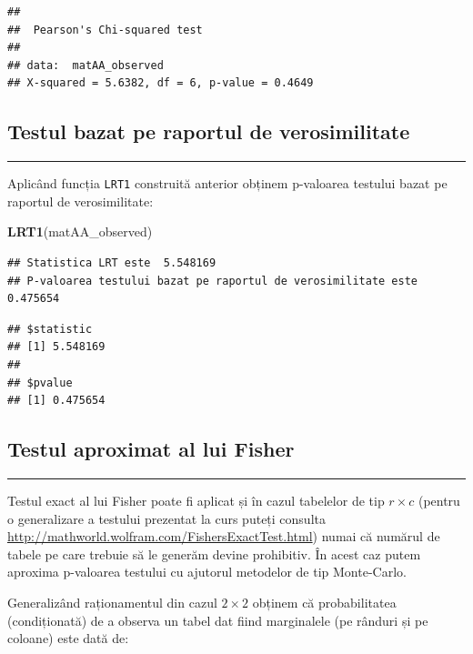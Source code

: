 \documentclass[]{article}
\newenvironment{Shaded}{\begin{snugshade}}{\end{snugshade}}
\newcommand{\KeywordTok}[1]{\textcolor[rgb]{0.13,0.29,0.53}{\textbf{{#1}}}}
\newcommand{\NormalTok}[1]{{#1}}
\begin{document}
\begin{verbatim}
## 
##  Pearson's Chi-squared test
## 
## data:  matAA_observed
## X-squared = 5.6382, df = 6, p-value = 0.4649
\end{verbatim}

\subsection{Testul bazat pe raportul de
verosimilitate}\label{testul-bazat-pe-raportul-de-verosimilitate}

\begin{center}\rule{0.5\linewidth}{\linethickness}\end{center}

Aplicând funcția \texttt{LRT1} construită anterior obținem p-valoarea
testului bazat pe raportul de verosimilitate:

\begin{Shaded}
\begin{Highlighting}[]
\KeywordTok{LRT1}\NormalTok{(matAA_observed)}
\end{Highlighting}
\end{Shaded}

\begin{verbatim}
## Statistica LRT este  5.548169 
## P-valoarea testului bazat pe raportul de verosimilitate este  0.475654
\end{verbatim}

\begin{verbatim}
## $statistic
## [1] 5.548169
## 
## $pvalue
## [1] 0.475654
\end{verbatim}

\subsection{Testul aproximat al lui
Fisher}\label{testul-aproximat-al-lui-fisher}

\begin{center}\rule{0.5\linewidth}{\linethickness}\end{center}

Testul exact al lui Fisher poate fi aplicat și în cazul tabelelor de tip
\(r\times c\) (pentru o generalizare a testului prezentat la curs puteți
consulta \url{http://mathworld.wolfram.com/FishersExactTest.html}) numai
că numărul de tabele pe care trebuie să le generăm devine prohibitiv. În
acest caz putem aproxima p-valoarea testului cu ajutorul metodelor de
tip Monte-Carlo.

Generalizând raționamentul din cazul \(2 \times 2\) obținem că
probabilitatea (condiționată) de a observa un tabel dat fiind
marginalele (pe rânduri și pe coloane) este dată de:
\end{document}
